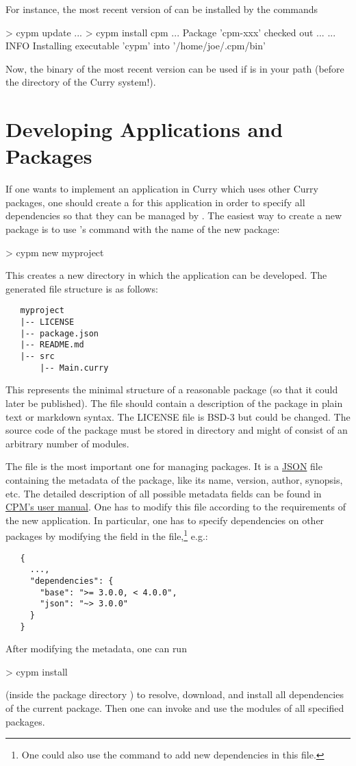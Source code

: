 For instance, the most recent version of \cpm
can be installed by the commands
%
\begin{curry}
> cypm update
...
> cypm install cpm
... Package 'cpm-xxx' checked out ...
...
INFO  Installing executable 'cypm' into '/home/joe/.cpm/bin'
\end{curry}
%
Now, the binary  of the most recent \cpm version can be used
if  is in your path
(before the  directory of the Curry system!).


\section{Developing Applications and Packages}
\label{sec:writing-packages}

If one wants to implement an application in Curry which uses
other Curry packages, one should create a  for
this application in order to specify all dependencies
so that they can be managed by \cpm.
The easiest way to create a new package is to use
\cpm's  command with the name of the new package:
%
\begin{curry}
> cypm new myproject
\end{curry}
%
This creates a new directory  in which
the application can be developed.
The generated file structure is as follows:
%
\begin{verbatim}
   myproject
   |-- LICENSE
   |-- package.json
   |-- README.md
   |-- src
       |-- Main.curry
\end{verbatim}
%
This represents the minimal structure of a reasonable package
(so that it could later be published).
The file  should contain a description
of the package in plain text or markdown syntax.
The LICENSE file is BSD-3 but could be changed.
The source code of the package must be stored
in directory  and might of consist of an arbitrary
number of modules.

The file  is the most important one
for managing packages. It is a \href{http://json.org}{JSON} file
containing the metadata of the package,
like its name, version, author, synopsis, etc.
The detailed description of all possible metadata fields
can be found in
\href{http://curry-lang.org/tools/cpm}{CPM's user manual}.
One has to modify this file according to the requirements
of the new application.
In particular, one has to specify dependencies on other packages
by modifying the field  in the
 file,\footnote{One could also use the command
 to add new dependencies in this file.}
e.g.:
%
\begin{verbatim}
   {
     ...,
     "dependencies": {
       "base": ">= 3.0.0, < 4.0.0",
       "json": "~> 3.0.0"
     }
   }
\end{verbatim}
%
After modifying the metadata, one can run
%
\begin{curry}
> cypm install
\end{curry}
%
(inside the package directory )
to resolve, download, and install all dependencies of the current package.
Then one can invoke \pakcs and use the modules of all specified
packages.

